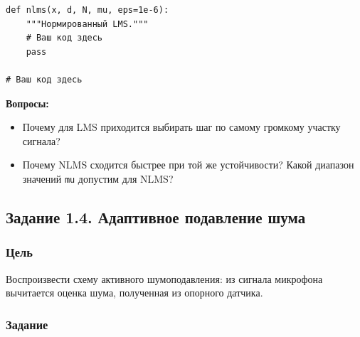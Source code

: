 \documentclass[12pt,a4paper,openany]{book}
\providecommand{\tightlist}{\setlength{\itemsep}{0pt}\setlength{\parskip}{0pt}}
\begin{document}
\begin{Verbatim}[fontsize=\small, breaklines, breakanywhere, frame=single, framesep=2mm]
def nlms(x, d, N, mu, eps=1e-6):
    """Нормированный LMS."""
    # Ваш код здесь
    pass

# Ваш код здесь
\end{Verbatim}

\textbf{Вопросы:}

\begin{itemize}
\tightlist
\item
  Почему для LMS приходится выбирать шаг по самому громкому участку сигнала?
\item
  Почему NLMS сходится быстрее при той же устойчивости? Какой диапазон значений \texttt{mu} допустим для NLMS?
\end{itemize}

\subsection*{Задание 1.4. Адаптивное подавление шума}

\subsubsection*{Цель}

Воспроизвести схему активного шумоподавления: из сигнала микрофона вычитается оценка шума, полученная из опорного датчика.

\subsubsection*{Задание}
\end{document}
